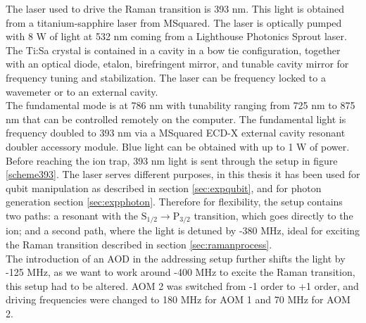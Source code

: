 The laser used to drive the Raman transition is 393 nm. This light is obtained from a titanium-sapphire laser from MSquared. The laser is optically pumped with 8 W of light at 532 nm coming from a Lighthouse Photonics Sprout laser. The Ti:Sa crystal is contained in a cavity in a bow tie configuration, together with an optical diode, etalon, birefringent mirror, and tunable cavity mirror for frequency tuning and stabilization. The laser can be frequency locked to a wavemeter or to an external cavity.\\ The fundamental mode is at 786 nm with tunability ranging from 725 nm to 875 nm that can be controlled remotely on the computer. The fundamental light is frequency doubled to 393 nm via a MSquared ECD-X external cavity resonant doubler accessory module. Blue light can be obtained with up to 1 W of power. Before reaching the ion trap, 393 nm light is sent through the setup in figure \ref{scheme393}. The laser serves different purposes, in this thesis it has been used for qubit manipulation as described in section \ref{sec:expqubit}, and for photon generation section \ref{sec:expphoton}. Therefore for flexibility, the setup contains two paths: a resonant with the $\text{S}_{1/2} \to \text{P}_{3/2}$ transition, which goes directly to the ion; and a second path, where the light is detuned by -380 MHz, ideal for exciting the Raman transition described in section \ref{sec:ramanprocess}.\\
The introduction of an AOD in the addressing setup further shifts the light by -125 MHz, as we want to work around -400 MHz to excite the Raman transition,
this setup had to be altered. AOM 2 was switched from -1 order to +1 order, and driving frequencies were changed to 180 MHz for AOM 1 and 70 MHz for AOM 2.

